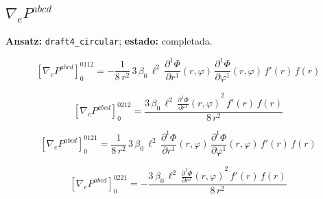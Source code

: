 \documentclass[11pt]{article}
\begin{document}
\subsection*{$ \nabla_e P^{abcd} $}
\textbf{Ansatz:} \texttt{draft4\_circular}; \textbf{estado:} completada.\par
\begin{dmath*}[breakdepth={5}]
\left[\nabla_e P^{abcd}\right]_{0}^{0112} = -\frac{1}{8\,{r}^{2}}\,3\,\beta_{0}\,{\ell}^{2}\,\frac{\partial^{1} \Phi}{\partial r^{1}}\!\left(r, \varphi\right)\,\frac{\partial^{1} \Phi}{\partial \varphi^{1}}\!\left(r, \varphi\right)\,f'\!\left(r\right)\,f\!\left(r\right)
\end{dmath*}
\par\smallskip
\begin{dmath*}[breakdepth={5}]
\left[\nabla_e P^{abcd}\right]_{0}^{0212} = \frac{3\,\beta_{0}\,{\ell}^{2}\,{\frac{\partial^{1} \Phi}{\partial r^{1}}\!\left(r, \varphi\right)}^{2}\,f'\!\left(r\right)\,f\!\left(r\right)}{8\,{r}^{2}}
\end{dmath*}
\par\smallskip
\begin{dmath*}[breakdepth={5}]
\left[\nabla_e P^{abcd}\right]_{0}^{0121} = \frac{1}{8\,{r}^{2}}\,3\,\beta_{0}\,{\ell}^{2}\,\frac{\partial^{1} \Phi}{\partial r^{1}}\!\left(r, \varphi\right)\,\frac{\partial^{1} \Phi}{\partial \varphi^{1}}\!\left(r, \varphi\right)\,f'\!\left(r\right)\,f\!\left(r\right)
\end{dmath*}
\par\smallskip
\begin{dmath*}[breakdepth={5}]
\left[\nabla_e P^{abcd}\right]_{0}^{0221} = -\frac{3\,\beta_{0}\,{\ell}^{2}\,{\frac{\partial^{1} \Phi}{\partial r^{1}}\!\left(r, \varphi\right)}^{2}\,f'\!\left(r\right)\,f\!\left(r\right)}{8\,{r}^{2}}
\end{dmath*}
\par\smallskip
\end{document}
